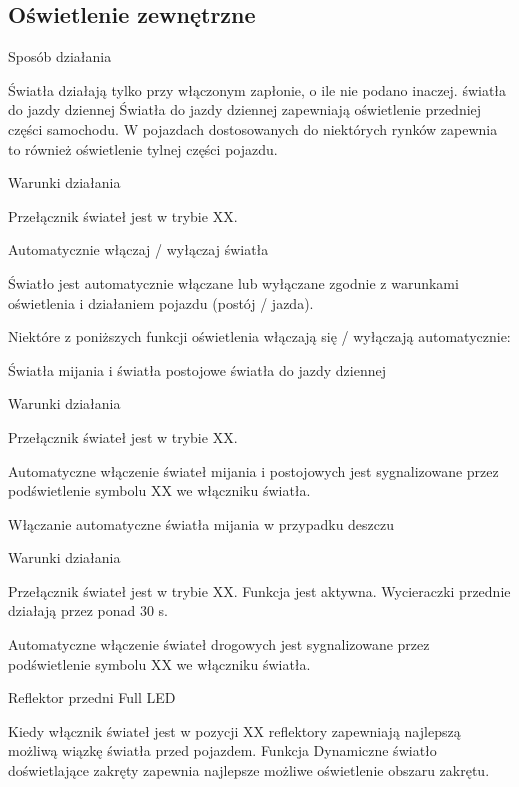 \subsection{Oświetlenie zewnętrzne}

Sposób działania

Światła działają tylko przy włączonym zapłonie, o ile nie podano inaczej.
światła do jazdy dziennej
Światła do jazdy dziennej zapewniają oświetlenie przedniej części samochodu.
W pojazdach dostosowanych do niektórych rynków zapewnia to również oświetlenie tylnej części pojazdu.

Warunki działania
\begin{itemizeTick}
	\itemTick Przełącznik świateł jest w trybie XX.
\end{itemizeTick}

Automatycznie włączaj / wyłączaj światła

Światło jest automatycznie włączane lub wyłączane zgodnie z warunkami oświetlenia i działaniem pojazdu (postój / jazda).

Niektóre z poniższych funkcji oświetlenia włączają się / wyłączają automatycznie:
\begin{itemizeTriangle}
	\itemTriangle Światła mijania i światła postojowe
	\itemTriangle światła do jazdy dziennej
\end{itemizeTriangle}

Warunki działania
\begin{itemizeTick}
	\itemTick Przełącznik świateł jest w trybie XX.
\end{itemizeTick}

Automatyczne włączenie świateł mijania i postojowych jest sygnalizowane przez podświetlenie symbolu XX we włączniku światła.

Włączanie automatyczne światła mijania w przypadku deszczu

Warunki działania
\begin{itemizeTick}
	\itemTick Przełącznik świateł jest w trybie XX.
	\itemTick Funkcja jest aktywna.
	\itemTick Wycieraczki przednie działają przez ponad 30 s.
\end{itemizeTick}

Automatyczne włączenie świateł drogowych jest sygnalizowane przez podświetlenie symbolu XX we włączniku światła.

Reflektor przedni Full LED

Kiedy włącznik świateł jest w pozycji XX reflektory zapewniają najlepszą możliwą wiązkę światła przed pojazdem.
Funkcja Dynamiczne światło doświetlające zakręty zapewnia najlepsze możliwe oświetlenie obszaru zakrętu.

